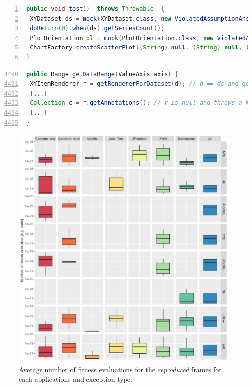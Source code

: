 \begin{lstlisting}[frame=tb,
  caption=The test case generated by EvoCrash for reproducing the 6th frame of CHART-4b,
  label=list:NPEtest,
  captionpos=t,
  language=Java,
  numbers=left]
public void test()  throws Throwable  {
 XYDataset ds = mock(XYDataset.class, new ViolatedAssumptionAnswer()); (*@\label{line:NPEtest:mock1}@*)
 doReturn(0).when(ds).getSeriesCount();
 PlotOrientation pl = mock(PlotOrientation.class, new ViolatedAssumptionAnswer()); (*@\label{line:NPEtest:mock2}@*)
 ChartFactory.createScatterPlot((String) null, (String) null, (String) null, ds, pl, true, true, true); (*@\label{line:NPEtest:crashcall}@*)
}
\end{lstlisting}

\begin{lstlisting}[frame=tb,
  caption={Code excerpt from JFreeChart \texttt{XYPlot.java}},
  label=list:XYPlot,
  captionpos=t,
  language=Java,
  numbers=left,
  firstnumber=4490,
  stepnumber=1]
public Range getDataRange(ValueAxis axis) {
 XYItemRenderer r = getRendererForDataset(d); // d == ds and getRendererForDataset(d) returns null (*@\label{line:XYPlot:null}@*)
 [...]
 Collection c = r.getAnnotations(); // r is null and throws a NPE (*@\label{line:XYPlot:NPE}@*)
 [...]
}
\end{lstlisting}

\begin{figure}[t]
	\centering
	\includegraphics[width=\textwidth]{papers/jcrashpack/rq2_excepappstats.pdf}
	\caption{Average number of fitness evaluations for the \textit{reproduced} frames for each applications and exception type.}
	\label{figure:appexcepstats}
\end{figure}

